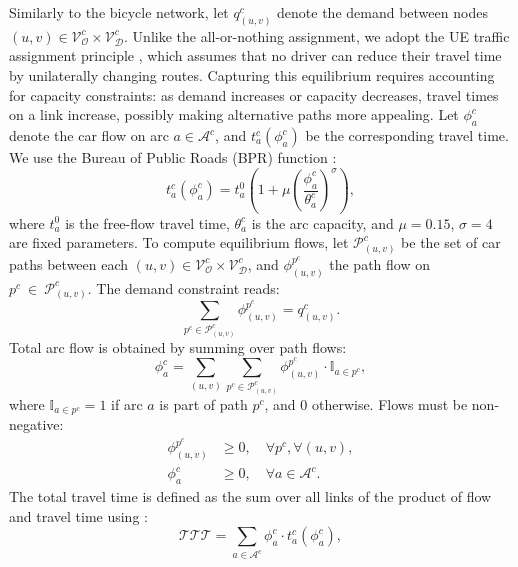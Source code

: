 \documentclass[letterpaper, 10 pt, conference]{ieeeconf}  %
\begin{document}
Similarly to the bicycle network, let $q_{(u,v)}^{c}$ denote the demand between nodes $(u, v) \in \mathcal{V}_{\mathcal{O}}^{c}\times \mathcal{V}_{\mathcal{D}}^{c}$. Unlike the all-or-nothing assignment, we adopt the UE traffic assignment principle \cite{maerivoet2005transportation}, which assumes that no driver can reduce their travel time by unilaterally changing routes. Capturing this equilibrium requires accounting for capacity constraints: as demand increases or capacity decreases, travel times on a link increase, possibly making alternative paths more appealing. Let $\phi_a^{c}$ denote the car flow on arc $a \in \mathcal{A}^{c}$, and $t_a^{c}(\phi_a^{c})$ be the corresponding travel time. We use the Bureau of Public Roads (BPR) function \cite{united1964traffic}:
\begin{equation}
\label{bpr_function}
    t_a^{c}(\phi_a^{c}) = t_a^0 \left( 1 + \mu \left( \frac{\phi_a^{c}}{\theta_a^{c}} \right)^\sigma \right),
\end{equation}
where $t_a^0$ is the free-flow travel time, $\theta_a^{c}$ is the arc capacity, and $\mu = 0.15$, $\sigma = 4$ are fixed parameters.
To compute equilibrium flows, let $\mathcal{P}_{(u,v)}^{c}$ be the set of car paths between each $(u, v) \in \mathcal{V}_{\mathcal{O}}^{c} \times \mathcal{V}_{\mathcal{D}}^{c}$, and $\phi_{(u,v)}^{p^{c}}$ the path flow on $p^{c}~\in~\mathcal{P}_{(u,v)}^{c}$. The demand constraint reads:
\begin{equation}
\label{t_a_m_1}
    \sum_{p^{c} \in \mathcal{P}_{(u,v)}^{c}} \phi_{(u,v)}^{p^{c}} = q_{(u,v)}^{c}.
\end{equation}
Total arc flow is obtained by summing over path flows:
\begin{equation}
\label{t_a_m_2}
    \phi_{a}^{c} = \sum_{(u,v)} \sum_{p^{c} \in \mathcal{P}_{(u,v)}^{c}} \phi_{(u,v)}^{p^{c}} \cdot \mathbb{I}_{a \in p^{c}},
\end{equation}
where $\mathbb{I}_{a \in p^{c}} = 1$ if arc $a$ is part of path $p^{c}$, and $0$ otherwise. Flows must be non-negative:
\begin{align}
    \label{t_a_m_3_1}
    \phi_{(u,v)}^{p^{c}} & \geq 0, \quad \forall p^{c}, \forall (u,v), \\
    \label{t_a_m_3_2}
    \phi_{a}^{c} & \geq 0, \quad \forall a \in \mathcal{A}^{c}.
\end{align}
The total travel time is defined as the sum over all links of the product of flow and travel time using \cite{beckmann1952lagrangian}:
\begin{equation}
    \mathcal{TTT} = \sum_{a \in \mathcal{A}^{c}} \phi^{c}_{a} \cdot t_a^{c}(\phi_{a}^{c}),
\end{equation}
\end{document}
